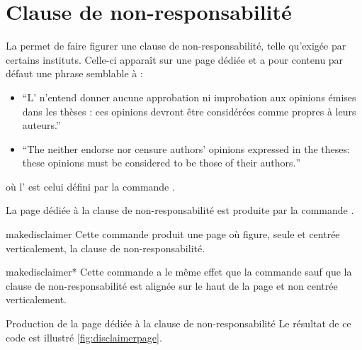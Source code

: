 \section{Clause de non-responsabilité}
\label{sec:clause-de-non}

La \yatcl{} permet de faire figurer une clause de non-responsabilité, telle
qu'exigée par certains instituts. Celle-ci apparaît sur une page dédiée et
a pour contenu par défaut une phrase semblable à\selonlangue{} :
  \begin{itemize}
  \item \enquote{L' n'entend donner aucune
      approbation ni improbation aux opinions \'emises dans les th\`eses : ces
      opinions devront \^etre consid\'er\'ees comme propres \`a leurs auteurs.}
  \item \foreignquote{english}{The  neither endorse
      nor censure authors' opinions expressed in the theses: these opinions
      must be considered to be those of their authors.}
  \end{itemize}
  où l' est celui défini par la commande 
  .

La page dédiée à la clause de non-responsabilité est produite par la commande
.

\begin{docCommand}{makedisclaimer}{}
  Cette commande produit une page où figure, seule et centrée
  verticalement, la clause de non-responsabilité.
\end{docCommand}

\begin{docCommand}{makedisclaimer*}{}
  Cette commande a le même effet que la commande
   sauf que la clause de non-responsabilité est alignée
  sur le haut de la page et non centrée verticalement.
\end{docCommand}

\begin{dbexample}{Production de la page dédiée à la clause de
    non-responsabilité}{}
  \NoAutoSpacing%
%
  Le résultat de ce code est illustré \vref{fig:disclaimerpage}.
\end{dbexample}

